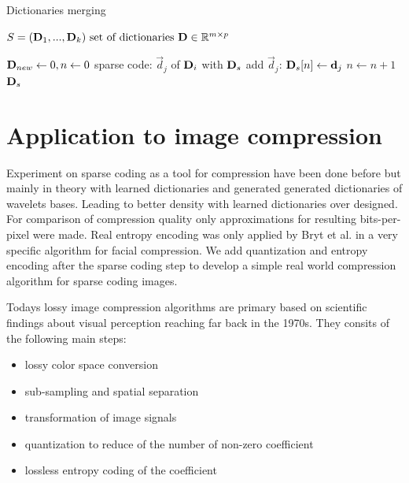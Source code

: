 \begin{algorithm}[H]
\caption{Dictionaries merging}
\label{alg:merging}
\begin{algorithmic}[1]
\REQUIRE $ S = (\boldsymbol{\mathrm{D}}_1, ..., \boldsymbol{\mathrm{D}}_k) \text{ set of dictionaries } \boldsymbol{\mathrm{D}}
\in \mathbb{R}^{m\times p}$

\STATE $\boldsymbol{\mathrm{D}}_{new} \gets 0, n \gets 0$
\STATE sparse code: $\vec{d}_j$ of $\boldsymbol{\mathrm{D}}_i$ with $\boldsymbol{\mathrm{D}}_{s}$
\STATE add $\vec{d}_j$: $\boldsymbol{\mathrm{D}}_{s}[n] \gets \boldsymbol{\mathrm{d}}_{j}$
\STATE $n \gets n+1$
\ENDIF
\ENDFOR
\ENDFOR
\RETURN $\boldsymbol{\mathrm{D}}_s$
\end{algorithmic}
\end{algorithm}



\section{Application to image compression}
\label{sec:compression}
Experiment on sparse coding as a tool for compression have been done
before\cite{Lewicki1999,Murray2006} but mainly in theory with learned
dictionaries and generated generated dictionaries of wavelets bases. Leading to
better density with learned dictionaries over designed. For comparison of
compression quality only approximations for resulting bits-per-pixel were
made. Real entropy encoding was only applied by Bryt et al.\cite{Bryt2008} in
a very specific algorithm for facial compression. We add quantization and
entropy encoding after the sparse coding step to develop a simple real world
compression algorithm for sparse coding images.

Todays lossy image compression algorithms are primary based on scientific
findings about visual perception reaching far back in the 1970s.
They consits of the following main steps:
\begin{itemize}
 \item lossy color space conversion
 \item sub-sampling and spatial separation
 \item transformation of image signals
 \item quantization to reduce of the number of non-zero coefficient 
 \item lossless entropy coding of the coefficient 
\end{itemize}

